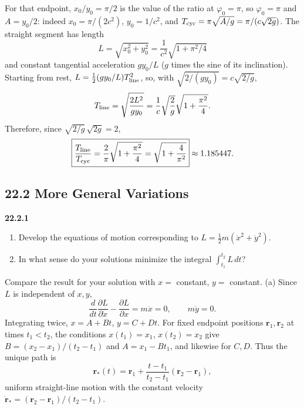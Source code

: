 For that endpoint, $x_0/y_0=\pi/2$ is the value of the ratio at
$\varphi_0=\pi$, so $\varphi_0=\pi$ and $A=y_0/2$: indeed
$x_0=\pi/(2c^2)$, $y_0=1/c^2$, and
$T_{\rm cyc}=\pi\sqrt{A/g}=\pi/(c\sqrt{2g})$.
The straight segment has length
\[
L=\sqrt{x_0^2+y_0^2}
=\frac1{c^2}\sqrt{1+\pi^2/4}
\]
and constant tangential acceleration $g y_0/L$ ($g$ times the sine of
its inclination). Starting from rest, $L=\tfrac12(gy_0/L)T_{\rm line}^2$,
so, with $\sqrt{2/(gy_0)}=c\sqrt{2/g}$,
\[
T_{\rm line}=\sqrt{\frac{2L^2}{g y_0}}
=\frac1c\sqrt{\frac2g}\sqrt{1+\frac{\pi^2}{4}}.
\]
Therefore, since $\sqrt{2/g}\,\sqrt{2g}=2$,
\[
\boxed{\frac{T_{\rm line}}{T_{\rm cyc}}
=\frac2\pi\sqrt{1+\frac{\pi^2}{4}}
=\sqrt{1+\frac4{\pi^2}}}\approx1.185447.
\]


\subsection*{22.2 More General Variations}

\par\bigskip
\noindent\textbf{22.2.1}\quad
{}
\begin{enumerate}
\item[(a)] Develop the equations of motion corresponding to
$L=\tfrac{1}{2}m(\dot{x}^{2}+\dot{y}^{2})$.
\item[(b)] In what sense do your solutions minimize the integral
$\displaystyle\int_{t_{1}}^{t_{2}}L\,dt$?
\end{enumerate}
Compare the result for your solution with $x=$ constant,
$y=$ constant.
\solution
(a) Since $L$ is independent of $x,y$,
\[
\frac d{dt}\frac{\partial L}{\partial\dot x}
-\frac{\partial L}{\partial x}=m\ddot x=0,\qquad
m\ddot y=0.
\]
Integrating twice, $x=A+Bt$, $y=C+Dt$. For fixed endpoint positions
$\mathbf r_1,\mathbf r_2$ at times $t_1<t_2$, the conditions
$x(t_1)=x_1$, $x(t_2)=x_2$ give $B=(x_2-x_1)/(t_2-t_1)$ and
$A=x_1-Bt_1$, and likewise for $C,D$. Thus the unique path is
\[
\boxed{\mathbf r_*(t)=\mathbf r_1+
\frac{t-t_1}{t_2-t_1}(\mathbf r_2-\mathbf r_1)},
\]
uniform straight-line motion with the constant velocity
$\dot{\mathbf r}_*=(\mathbf r_2-\mathbf r_1)/(t_2-t_1)$.

